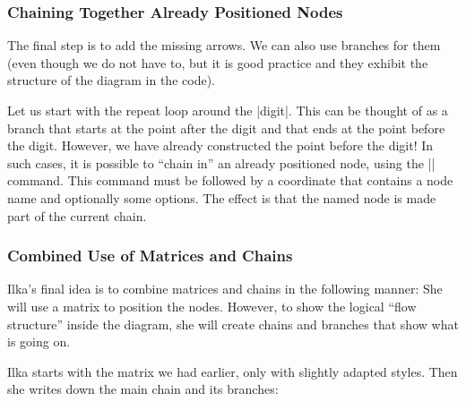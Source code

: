 \subsubsection{Chaining Together Already Positioned Nodes}

The final step is to add the missing arrows. We can also use branches
for them (even though we do not have to, but it is good practice and
they exhibit the structure of the diagram in the code).

Let us start with the repeat loop around the |digit|. This can be
thought of as a branch that starts at the point after the digit and
that ends at the point before the digit. However, we have already
constructed the point before the digit! In such cases, it is possible
to ``chain in'' an already positioned node, using the |\chainin|
command. This command must be followed by a coordinate that contains a
node name and optionally some options. The effect is that the named
node is made part of the current chain.

\begin{codeexample}[pre={\tikzset{node distance=5mm and 2mm,
                    every node/.style={on chain},    
                    terminal/.append style={join=by ->},    
                    point/.style={join=by -,circle,fill=red,minimum size=2pt,inner sep=0pt}}}]
\end{codeexample}


\subsubsection{Combined Use of Matrices and Chains}

Ilka's final idea is to combine matrices and chains in the following
manner: She will use a matrix to position the nodes. However, to show
the logical ``flow structure'' inside the diagram, she will create
chains and branches that show what is going on.

Ilka starts with the matrix we had earlier, only with slightly adapted
styles. Then she writes down the main chain and its branches:

